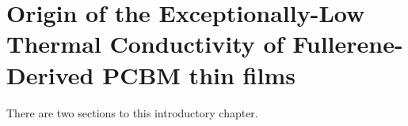 \chapter{Origin of the Exceptionally-Low Thermal Conductivity of Fullerene-Derived PCBM thin films}
There are two sections to this introductory chapter.

